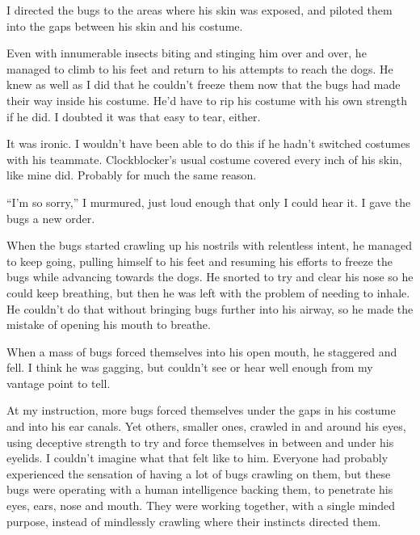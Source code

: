 I directed the bugs to the areas where his skin was exposed, and piloted them into the gaps between his skin and his costume.



Even with innumerable insects biting and stinging him over and over, he managed to climb to his feet and return to his attempts to reach the dogs.  He knew as well as I did that he couldn't freeze them now that the bugs had made their way inside his costume.  He'd have to rip his costume with his own strength if he did.  I doubted it was that easy to tear, either.



It was ironic.  I wouldn't have been able to do this if he hadn't switched costumes with his teammate.  Clockblocker's usual costume covered every inch of his skin, like mine did.  Probably for much the same reason.



``I'm so sorry,'' I murmured, just loud enough that only I could hear it.  I gave the bugs a new order.



When the bugs started crawling up his nostrils with relentless intent, he managed to keep going, pulling himself to his feet and resuming his efforts to freeze the bugs while advancing towards the dogs.  He snorted to try and clear his nose so he could keep breathing, but then he was left with the problem of needing to inhale.  He couldn't do that without bringing bugs further into his airway, so he made the mistake of opening his mouth to breathe.



When a mass of bugs forced themselves into his open mouth, he staggered and fell.  I think he was gagging, but couldn't see or hear well enough from my vantage point to tell.



At my instruction, more bugs forced themselves under the gaps in his costume and into his ear canals.  Yet others, smaller ones, crawled in and around his eyes, using deceptive strength to try and force themselves in between and under his eyelids.  I couldn't imagine what that felt like to him.  Everyone had probably experienced the sensation of having a lot of bugs crawling on them, but these bugs were operating with a human intelligence backing them, to penetrate his eyes, ears, nose and mouth.  They were working together, with a single minded purpose, instead of mindlessly crawling where their instincts directed them.



